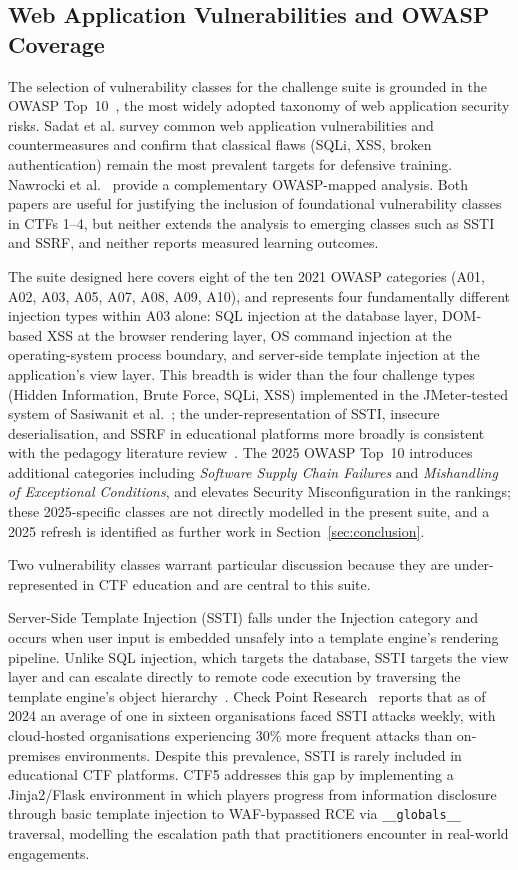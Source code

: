 \subsection{Web Application Vulnerabilities and OWASP Coverage}
The selection of vulnerability classes for the challenge suite is
grounded in the OWASP Top~10~\cite{OWASP2025}, the most widely
adopted taxonomy of web application security risks. Sadat et al.
\cite{sadat2024} survey common web application vulnerabilities and
countermeasures and confirm that classical flaws (SQLi, XSS, broken
authentication) remain the most prevalent targets for defensive
training. Nawrocki et al.~\cite{nawrocki} provide a complementary
OWASP-mapped analysis. Both papers are useful for justifying the
inclusion of foundational vulnerability classes in CTFs 1--4, but
neither extends the analysis to emerging classes such as SSTI and
SSRF, and neither reports measured learning outcomes.

The suite designed here covers eight of the ten 2021 OWASP
categories (A01, A02, A03, A05, A07, A08, A09, A10), and
represents four fundamentally different injection types within
A03 alone: SQL injection at the database layer, DOM-based XSS
at the browser rendering layer, OS command injection at the
operating-system process boundary, and server-side template
injection at the application's view layer. This breadth is wider than the four challenge types
(Hidden Information, Brute Force, SQLi, XSS) implemented in
the JMeter-tested system of Sasiwanit et al.~\cite{Sasiwanit};
the under-representation of SSTI, insecure deserialisation,
and SSRF in educational platforms more broadly is consistent
with the pedagogy literature
review~\cite{Svabensky2021,Vykopal}. The 2025 OWASP Top~10 introduces additional
categories including \textit{Software Supply Chain Failures}
and \textit{Mishandling of Exceptional Conditions}, and
elevates Security Misconfiguration in the rankings; these
2025-specific classes are not directly modelled in the present
suite, and a 2025 refresh is identified as further work in
Section~\ref{sec:conclusion}.

Two vulnerability classes warrant particular discussion because they
are under-represented in CTF education and are central to this
suite.

Server-Side Template Injection (SSTI) falls under the Injection
category and occurs when user input is embedded unsafely into a
template engine's rendering pipeline. Unlike SQL injection, which
targets the database, SSTI targets the view layer and can escalate
directly to remote code execution by traversing the template
engine's object hierarchy~\cite{PortSwiggerSSTI,JinjaMRO}. Check
Point Research~\cite{CheckPointSSTI2024} reports that as of 2024
an average of one in sixteen organisations faced SSTI attacks
weekly, with cloud-hosted organisations experiencing 30\% more
frequent attacks than on-premises environments. Despite this
prevalence, SSTI is rarely included in educational CTF platforms.
CTF5 addresses this gap by implementing a Jinja2/Flask environment
in which players progress from information disclosure through
basic template injection to WAF-bypassed RCE via
\texttt{\_\_globals\_\_} traversal,
modelling the escalation path that practitioners encounter in
real-world engagements.


